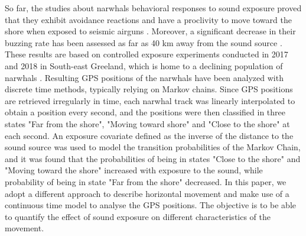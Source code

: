 \documentclass[11pt]{article}
\newcommand {\1}{\mathbb{1}}
\begin{document}
So far, the studies about narwhals behavioral responses to sound exposure proved that they exhibit avoidance reactions and have a proclivity to move toward the shore when exposed to seismic airguns \cite{heide-jorgensen_behavioral_2021}. Moreover, a significant decrease in their buzzing rate has been assessed as far as 40 km away from the sound source \cite{tervo_narwhals_2021}. These results are based on controlled exposure experiments conducted in 2017 and 2018 in South-east Greeland, which is home to a declining population of narwhals \cite{garde_biological_2022}. Resulting GPS positions of the narwhals have been analyzed with discrete time methods, typically relying on Markov chains. Since GPS positions are retrieved irregularly in time, each narwhal track was linearly interpolated to obtain a position every second, and the positions were then classified in three states "Far from the shore", "Moving toward shore" and "Close to the shore" at each second. An exposure covariate defined as the inverse of the distance to the sound source was used to model the transition probabilities of the Markov Chain, and it was found that the probabilities of being in states "Close to the shore" and "Moving toward the shore" increased with exposure to the sound, while probability of being in state "Far from the shore" decreased. In this paper, we adopt a different approach to describe horizontal movement and make use of a continuous time model to analyse the GPS positions. The objective is to be able to quantify  the effect of sound exposure on different characteristics of the movement.\\
\end{document}

